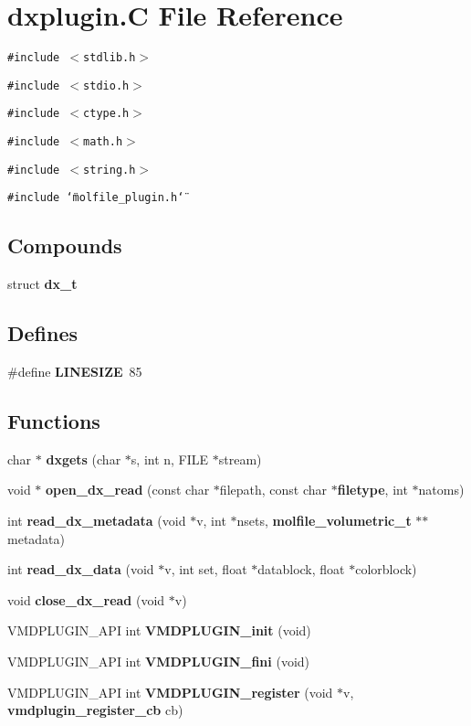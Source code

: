 \section{dxplugin.C File Reference}
\label{dxplugin_8C}
{\tt \#include $<$stdlib.h$>$}\par
{\tt \#include $<$stdio.h$>$}\par
{\tt \#include $<$ctype.h$>$}\par
{\tt \#include $<$math.h$>$}\par
{\tt \#include $<$string.h$>$}\par
{\tt \#include \char`\"{}molfile\_\-plugin.h\char`\"{}}\par
\subsection*{Compounds}
\begin{CompactItemize}
\item 
struct {\bf dx\_\-t}
\end{CompactItemize}
\subsection*{Defines}
\begin{CompactItemize}
\item 
\#define {\bf LINESIZE}\ 85
\end{CompactItemize}
\subsection*{Functions}
\begin{CompactItemize}
\item 
char $\ast$ {\bf dxgets} (char $\ast$s, int n, FILE $\ast$stream)
\item 
void $\ast$ {\bf open\_\-dx\_\-read} (const char $\ast$filepath, const char $\ast${\bf filetype}, int $\ast$natoms)
\item 
int {\bf read\_\-dx\_\-metadata} (void $\ast$v, int $\ast$nsets, {\bf molfile\_\-volumetric\_\-t} $\ast$$\ast$metadata)
\item 
int {\bf read\_\-dx\_\-data} (void $\ast$v, int set, float $\ast$datablock, float $\ast$colorblock)
\item 
void {\bf close\_\-dx\_\-read} (void $\ast$v)
\item 
VMDPLUGIN\_\-API int {\bf VMDPLUGIN\_\-init} (void)
\item 
VMDPLUGIN\_\-API int {\bf VMDPLUGIN\_\-fini} (void)
\item 
VMDPLUGIN\_\-API int {\bf VMDPLUGIN\_\-register} (void $\ast$v, {\bf vmdplugin\_\-register\_\-cb} cb)
\end{CompactItemize}
